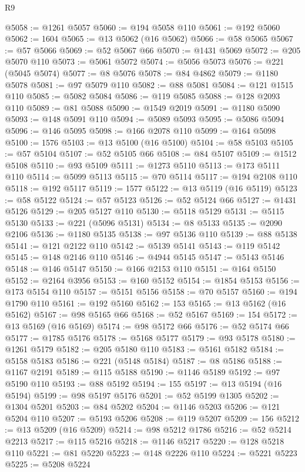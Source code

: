 \begin{lexlean}{R9}
\begin{coremodule}
@5058 := @1261 @5057
@5060 := @194 @5058 @110
@5061 := @192 @5060
@5062 := 1604
@5065 := @13 @5062 (@16 @5062)
@5066 := @58 @5065
@5067 := @57 @5066
@5069 := @52 @5067 @66
@5070 := @1431 @5069
@5072 := @205 @5070 @110
@5073 := @5061 @5072
@5074 := @5056 @5073
@5076 := @221 (@5045 @5074)
@5077 := @8 @5076
@5078 := @84 @4862
@5079 := @1180 @5078
@5081 := @97 @5079 @110
@5082 := @88 @5081
@5084 := @121 @1515 @110
@5085 := @5082 @5084
@5086 := @119 @5085
@5088 := @128 @2093 @110
@5089 := @81 @5088
@5090 := @1549 @2019
@5091 := @1180 @5090
@5093 := @148 @5091 @110
@5094 := @5089 @5093
@5095 := @5086 @5094
@5096 := @146 @5095
@5098 := @166 @2078 @110
@5099 := @164 @5098
@5100 := 1576
@5103 := @13 @5100 (@16 @5100)
@5104 := @58 @5103
@5105 := @57 @5104
@5107 := @52 @5105 @66
@5108 := @84 @5107
@5109 := @1512 @5108
@5110 := @93 @5109
@5111 := @1273 @5110
@5113 := @173 @5111 @110
@5114 := @5099 @5113
@5115 := @70 @5114
@5117 := @194 @2108 @110
@5118 := @192 @5117
@5119 := 1577
@5122 := @13 @5119 (@16 @5119)
@5123 := @58 @5122
@5124 := @57 @5123
@5126 := @52 @5124 @66
@5127 := @1431 @5126
@5129 := @205 @5127 @110
@5130 := @5118 @5129
@5131 := @5115 @5130
@5133 := @221 (@5096 @5131)
@5134 := @8 @5133
@5135 := @2090 @2106
@5136 := @1180 @5135
@5138 := @97 @5136 @110
@5139 := @88 @5138
@5141 := @121 @2122 @110
@5142 := @5139 @5141
@5143 := @119 @5142
@5145 := @148 @2146 @110
@5146 := @4944 @5145
@5147 := @5143 @5146
@5148 := @146 @5147
@5150 := @166 @2153 @110
@5151 := @164 @5150
@5152 := @2164 @3956
@5153 := @160 @5152
@5154 := @1854 @5153
@5156 := @173 @5154 @110
@5157 := @5151 @5156
@5158 := @70 @5157
@5160 := @194 @1790 @110
@5161 := @192 @5160
@5162 := 153
@5165 := @13 @5162 (@16 @5162)
@5167 := @98 @5165 @66
@5168 := @52 @5167
@5169 := 154
@5172 := @13 @5169 (@16 @5169)
@5174 := @98 @5172 @66
@5176 := @52 @5174 @66
@5177 := @1785 @5176
@5178 := @5168 @5177
@5179 := @93 @5178
@5180 := @1261 @5179
@5182 := @205 @5180 @110
@5183 := @5161 @5182
@5184 := @5158 @5183
@5186 := @221 (@5148 @5184)
@5187 := @8 @5186
@5188 := @1167 @2191
@5189 := @115 @5188
@5190 := @1146 @5189
@5192 := @97 @5190 @110
@5193 := @88 @5192
@5194 := 155
@5197 := @13 @5194 (@16 @5194)
@5199 := @98 @5197 @5176
@5201 := @52 @5199 @1305
@5202 := @1304 @5201
@5203 := @84 @5202
@5204 := @1146 @5203
@5206 := @121 @5204 @110
@5207 := @5193 @5206
@5208 := @119 @5207
@5209 := 156
@5212 := @13 @5209 (@16 @5209)
@5214 := @98 @5212 @1786
@5216 := @52 @5214 @2213
@5217 := @115 @5216
@5218 := @1146 @5217
@5220 := @128 @5218 @110
@5221 := @81 @5220
@5223 := @148 @2226 @110
@5224 := @5221 @5223
@5225 := @5208 @5224

\end{coremodule}
\end{lexlean}
